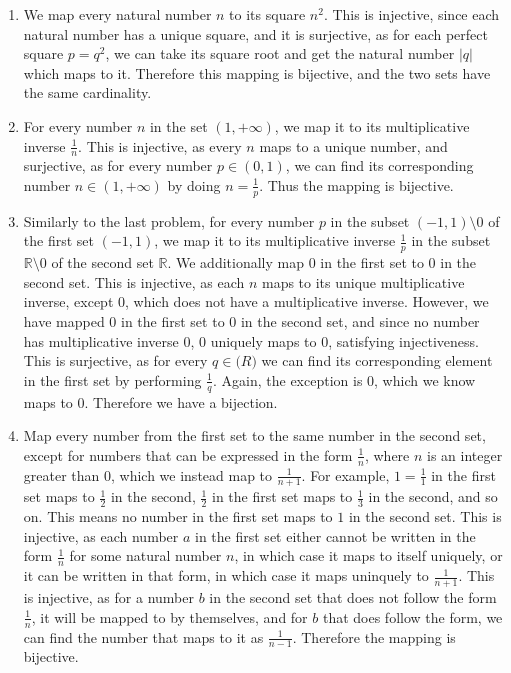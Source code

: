 \begin{enumerate}
    \item We map every natural number $n$ to its square $n^2$. This is injective, since each natural number has a unique square, and it is surjective, as for each perfect square $p = q^2$, we can take its square root and get the natural number $|q|$ which maps to it. Therefore this mapping is bijective, and the two sets have the same cardinality.
    \item For every number $n$ in the set $(1, +\infty)$, we map it to its multiplicative inverse $\frac{1}{n}$. This is injective, as every $n$ maps to a unique number, and surjective, as for every number $p \in (0, 1)$, we can find its corresponding number $n \in (1, +\infty)$ by doing $n=\frac{1}{p}$. Thus the mapping is bijective.
    \item Similarly to the last problem, for every number $p$ in the subset $(-1, 1) \setminus 0$ of the first set $(-1, 1)$, we map it to its multiplicative inverse $\frac{1}{p}$ in the subset $\mathbb{R} \setminus 0$ of the second set $\mathbb{R}$. We additionally map $0$ in the first set to $0$ in the second set. This is injective, as each $n$ maps to its unique multiplicative inverse, except 0, which does not have a multiplicative inverse. However, we have mapped 0 in the first set to 0 in the second set, and since no number has multiplicative inverse 0, 0 uniquely maps to 0, satisfying injectiveness. This is surjective, as for every $q \in \mathbb(R)$ we can find its corresponding element in the first set by performing $\frac{1}{q}$. Again, the exception is 0, which we know maps to 0. Therefore we have a bijection.
    \item Map every number from the first set to the same number in the second set, except for numbers that can be expressed in the form $\frac{1}{n}$, where $n$ is an integer greater than 0, which we instead map to $\frac{1}{n+1}$. For example, $1=\frac{1}{1}$ in the first set maps to $\frac{1}{2}$ in the second, $\frac{1}{2}$ in the first set maps to $\frac{1}{3}$ in the second, and so on. This means no number in the first set maps to $1$ in the second set. This is injective, as each number $a$ in the first set either cannot be written in the form $\frac{1}{n}$ for some natural number $n$, in which case it maps to itself uniquely, or it can be written in that form, in which case it maps uninquely to $\frac{1}{n+1}$. This is injective, as for a number $b$ in the second set that does not follow the form $\frac{1}{n}$, it will be mapped to by themselves, and for $b$ that does follow the form, we can find the number that maps to it as $\frac{1}{n-1}$. Therefore the mapping is bijective.
\end{enumerate}



